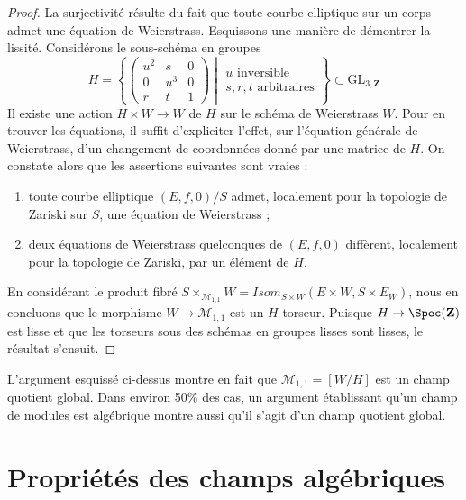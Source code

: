 \begin{proof}
La surjectivité résulte du fait que toute courbe elliptique sur un corps admet
une équation de Weierstrass. Esquissons une manière de démontrer la lissité.
Considérons le sous-schéma en groupes
$$
H =
\left\{
\left(
\begin{matrix}
u^2 & s & 0 \\
0 & u^3 & 0 \\
r & t & 1
\end{matrix}
\right)
\middle|
\begin{matrix}
u\text{ inversible} \\
s, r, t\text{ arbitraires}
\end{matrix}
\right\}
\subset
\text{GL}_{3, \mathbf{Z}}
$$
Il existe une action $H \times W \to W$ de $H$ sur le schéma de Weierstrass
$W$. Pour en trouver les équations, il suffit d'expliciter l'effet, sur
l'équation générale de Weierstrass, d'un changement de coordonnées donné par
une matrice de $H$. On constate alors que les assertions suivantes sont vraies :
\begin{enumerate}
\item toute courbe elliptique $(E, f, 0)/S$ admet, localement pour la topologie
de Zariski sur $S$, une équation de Weierstrass ;
\item deux équations de Weierstrass quelconques de $(E, f, 0)$ diffèrent,
localement pour la topologie de Zariski, par un élément de $H$.
\end{enumerate}
En considérant le produit fibré
$S \times_{\mathcal{M}_{1, 1}} W =
\mathit{Isom}_{S \times W}(E \times W, S \times E_W)$,
nous en concluons que le morphisme $W \to \mathcal{M}_{1, 1}$ est un
$H$-torseur. Puisque $H \to \Spec(\mathbf{Z})$ est lisse et que les torseurs
sous des schémas en groupes lisses sont lisses, le résultat s'ensuit.
\end{proof}

\begin{remark}
\label{remark-quotient-stack}
L'argument esquissé ci-dessus montre en fait que
$\mathcal{M}_{1, 1} = [W/H]$ est un champ quotient global.
Dans environ 50\% des cas, un argument établissant qu'un champ de modules est
algébrique montre aussi qu'il s'agit d'un champ quotient global.
\end{remark}



\section{Propriétés des champs algébriques}
\label{section-properties}

